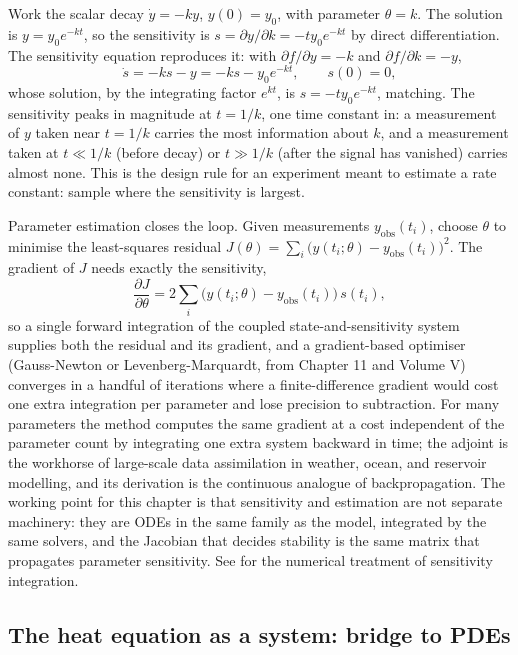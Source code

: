 Work the scalar decay $\dot{y} = -k y$, $y(0) = y_{0}$, with parameter
$\theta = k$. The solution is $y = y_{0} e^{-kt}$, so the sensitivity
is $s = \partial y/\partial k = -t y_{0} e^{-kt}$ by direct
differentiation. The sensitivity equation reproduces it: with
$\partial f/\partial y = -k$ and $\partial f/\partial k = -y$,
\[
\dot{s} = -k s - y = -k s - y_{0} e^{-kt}, \qquad s(0) = 0,
\]
whose solution, by the integrating factor $e^{kt}$, is $s = -t y_{0}
e^{-kt}$, matching. The sensitivity peaks in magnitude at $t = 1/k$,
one time constant in: a measurement of $y$ taken near $t = 1/k$ carries
the most information about $k$, and a measurement taken at $t \ll 1/k$
(before decay) or $t \gg 1/k$ (after the signal has vanished) carries
almost none. This is the design rule for an experiment meant to
estimate a rate constant: sample where the sensitivity is largest.

Parameter estimation closes the loop. Given measurements
$y_{\text{obs}}(t_{i})$, choose $\theta$ to minimise the least-squares
residual $J(\theta) = \sum_{i}\bigl(y(t_{i}; \theta) -
y_{\text{obs}}(t_{i})\bigr)^{2}$. The gradient of $J$ needs exactly the
sensitivity,
\[
\frac{\partial J}{\partial \theta} = 2\sum_{i}\bigl(y(t_{i}; \theta) -
y_{\text{obs}}(t_{i})\bigr)\, s(t_{i}),
\]
so a single forward integration of the coupled state-and-sensitivity
system supplies both the residual and its gradient, and a
gradient-based optimiser (Gauss-Newton or Levenberg-Marquardt, from
Chapter 11 and Volume V) converges in a handful of iterations where a
finite-difference gradient would cost one extra integration per
parameter and lose precision to subtraction. For many parameters the
 method computes the same gradient at a cost
independent of the parameter count by integrating one extra system
backward in time; the adjoint is the workhorse of large-scale
data assimilation in weather, ocean, and reservoir modelling, and its
derivation is the continuous analogue of backpropagation. The working
point for this chapter is that sensitivity and estimation are not
separate machinery: they are ODEs in the same family as the model,
integrated by the same solvers, and the Jacobian that decides stability
is the same matrix that propagates parameter sensitivity. See
\textcite{text:v2ch07-hairer-norsett-wanner} for the numerical
treatment of sensitivity integration.

\subsection{The heat equation as a system: bridge to PDEs}

